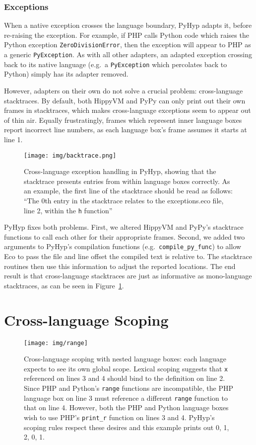 \documentclass[a4paper,UKenglish]{lipics-v2016}
\newcommand{\ourvm}{PyHyp\xspace}
\newcommand{\hippy}{HippyVM\xspace}
\newcommand{\pypy}{PyPy\xspace}
\begin{document}
{{\subsubsection{Exceptions}

When a native exception crosses the language boundary, \ourvm adapts it, before
re-raising the exception. For example, if PHP calls Python code which raises the
Python exception \texttt{ZeroDivisionError}, then the exception will appear to
PHP as a generic \texttt{PyException}. As with all other adapters, an adapted
exception crossing back to
its native language (e.g.~a \texttt{PyException} which percolates back to
Python) simply has its adapter removed.

However, adapters on their own do not solve a crucial problem: cross-language
stacktraces. By default, both \hippy and \pypy can only print out their own
frames in stacktraces, which makes cross-language exceptions seem to appear out
of thin air. Equally frustratingly, frames which represent inner language boxes
report incorrect line numbers, as each language box's frame assumes it
starts at line 1.

\begin{figure}[t]
\centering
\texttt{[image: img/backtrace.png]}
\caption{Cross-language exception handling in \ourvm, showing
that the stacktrace presents entries from within language boxes correctly. As an example,
the first line of the stacktrace should be read as follows: ``The 0th
entry in the stacktrace relates to the exceptions.eco file, line 2,
within the \texttt{h} function''}
\label{fig:exns}
\end{figure}


\ourvm fixes both problems. First, we altered
\hippy and \pypy's stacktrace functions to call each other for their
appropriate frames. Second, we added two arguments to \ourvm's compilation functions
(e.g.~\texttt{compile\_py\_func}) to allow Eco to pass the file and line
offset the compiled text is relative to. The stacktrace routines then use
this information to adjust the reported locations. The end result is that
cross-language stacktraces are just as informative as mono-language
stacktraces, as can be seen in Figure~\ref{fig:exns}.


\section{Cross-language Scoping}
\label{sec:xscope}

\begin{figure}[t]
\centering
\texttt{[image: img/range]}
\caption{Cross-language scoping with nested language boxes: each language
expects to see its own
global scope. Lexical scoping suggests that \texttt{x}
referenced on lines 3 and 4 should bind to the definition on line 2. Since
PHP and Python's \texttt{range} functions are incompatible,
the PHP language box on line 3 must reference a different
\texttt{range} function to that on line 4. However,
both the PHP and Python language boxes wish to use PHP's \texttt{print\_r}
function on lines 3 and 4. \ourvm's
scoping rules respect these desires and this example prints out 0, 1, 2, 0, 1.}
\label{fig:range}
\end{figure}

}}
\end{document}
